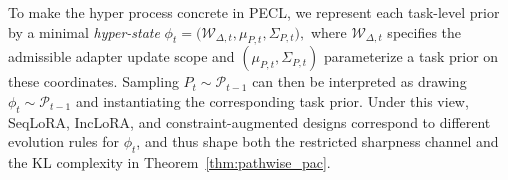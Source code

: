 \documentclass{article}
\theoremstyle{plain}
\theoremstyle{definition}
\theoremstyle{remark}
\begin{document}
To make the hyper process concrete in PECL, we represent each task-level prior by a minimal \emph{hyper-state}
$
\phi_t = \bigl(\mathcal W_{\Delta,t},\mu_{P,t},\Sigma_{P,t}\bigr),
$
where $\mathcal W_{\Delta,t}$ specifies the admissible adapter update scope and $(\mu_{P,t},\Sigma_{P,t})$ parameterize a task prior on these coordinates.
Sampling $P_t\sim\mathcal P_{t-1}$ can then be interpreted as drawing $\phi_t\sim\mathcal P_{t-1}$ and instantiating the corresponding task prior. Under this view, SeqLoRA, IncLoRA, and constraint-augmented designs correspond to different evolution rules for $\phi_t$, and thus shape both the restricted sharpness channel and the KL complexity in Theorem~\ref{thm:pathwise_pac}.






\end{document}

